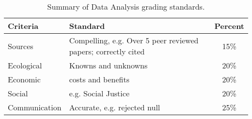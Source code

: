\begin{table}[h]
\caption{Summary of Data Analysis grading standards.}
\label{tab:regionalimpactsgrading}
\begin{tabular}{llc}\hline
Criteria            &   Standard    & Percent \\ \hline\hline
Sources     & Compelling, e.g. Over 5 peer reviewed papers; correctly cited & 15\% \\
Ecological  & Knowns and unknowns             & 20\% \\
Economic    & costs and benefits              & 20\% \\
Social      & e.g. Social Justice             & 20\% \\
Communication    & Accurate, e.g. rejected null   & 25\% \\

\hline
\end{tabular}
\end{table}